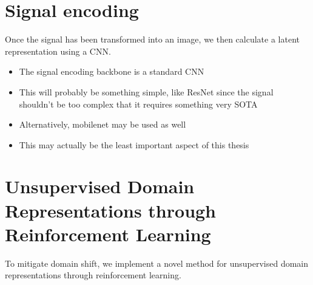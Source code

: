 \section{Signal encoding}\label{sec:methodology-signal-encoding}

Once the signal has been transformed into an image, we then calculate a latent representation using a CNN.

\begin{itemize}
	\item The signal encoding backbone is a standard CNN
	\item This will probably be something simple, like ResNet since the signal shouldn't be too complex that it requires something very SOTA
	\item Alternatively, mobilenet may be used as well
	\item This may actually be the least important aspect of this thesis
\end{itemize}

\section{Unsupervised Domain Representations through Reinforcement Learning}

To mitigate domain shift, we implement a novel method for unsupervised domain representations through reinforcement learning.


